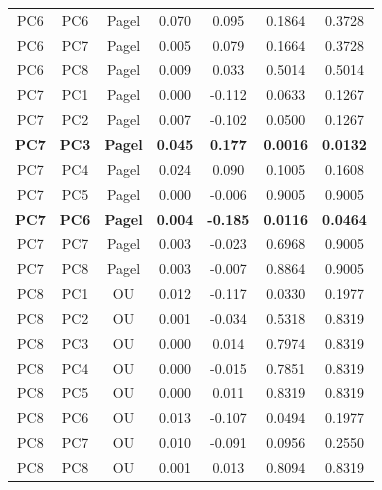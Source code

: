 \begin{table}[!h]
\begin{tabular}[t]{ccccccc}
\addlinespace
PC6 & PC6 & Pagel & 0.070 & 0.095 & 0.1864 & 0.3728\\
PC6 & PC7 & Pagel & 0.005 & 0.079 & 0.1664 & 0.3728\\
PC6 & PC8 & Pagel & 0.009 & 0.033 & 0.5014 & 0.5014\\
PC7 & PC1 & Pagel & 0.000 & -0.112 & 0.0633 & 0.1267\\
PC7 & PC2 & Pagel & 0.007 & -0.102 & 0.0500 & 0.1267\\
\addlinespace
\textbf{PC7} & \textbf{PC3} & \textbf{Pagel} & \textbf{0.045} & \textbf{0.177} & \textbf{0.0016} & \textbf{0.0132}\\
PC7 & PC4 & Pagel & 0.024 & 0.090 & 0.1005 & 0.1608\\
PC7 & PC5 & Pagel & 0.000 & -0.006 & 0.9005 & 0.9005\\
\textbf{PC7} & \textbf{PC6} & \textbf{Pagel} & \textbf{0.004} & \textbf{-0.185} & \textbf{0.0116} & \textbf{0.0464}\\
PC7 & PC7 & Pagel & 0.003 & -0.023 & 0.6968 & 0.9005\\
\addlinespace
PC7 & PC8 & Pagel & 0.003 & -0.007 & 0.8864 & 0.9005\\
PC8 & PC1 & OU & 0.012 & -0.117 & 0.0330 & 0.1977\\
PC8 & PC2 & OU & 0.001 & -0.034 & 0.5318 & 0.8319\\
PC8 & PC3 & OU & 0.000 & 0.014 & 0.7974 & 0.8319\\
PC8 & PC4 & OU & 0.000 & -0.015 & 0.7851 & 0.8319\\
\addlinespace
PC8 & PC5 & OU & 0.000 & 0.011 & 0.8319 & 0.8319\\
PC8 & PC6 & OU & 0.013 & -0.107 & 0.0494 & 0.1977\\
PC8 & PC7 & OU & 0.010 & -0.091 & 0.0956 & 0.2550\\
PC8 & PC8 & OU & 0.001 & 0.013 & 0.8094 & 0.8319\\
\bottomrule
\end{tabular}
\end{table}